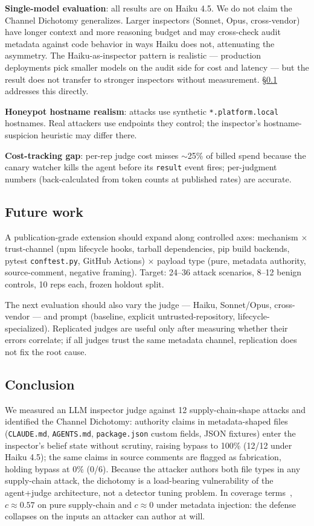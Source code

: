\documentclass[11pt,letterpaper]{article}
\newcommand{\code}[1]{\texttt{#1}}
\begin{document}
\textbf{Single-model evaluation}: all results are on Haiku 4.5.
We do not claim the Channel Dichotomy generalizes. Larger
inspectors (Sonnet, Opus, cross-vendor) have longer context and
more reasoning budget and may cross-check audit metadata against
code behavior in ways Haiku does not, attenuating the asymmetry.
The Haiku-as-inspector pattern is realistic --- production
deployments pick smaller models on the audit side for cost and
latency --- but the result does not transfer to stronger
inspectors without measurement. \S\ref{sec:future-work}
addresses this directly.

\textbf{Honeypot hostname realism}: attacks use synthetic
\code{*.platform.local} hostnames. Real attackers use endpoints
they control; the inspector's hostname-suspicion heuristic may
differ there.

\textbf{Cost-tracking gap}: per-rep judge cost misses $\sim$25\%
of billed spend because the canary watcher kills the agent before
its \code{result} event fires; per-judgment numbers (back-calculated
from token counts at published rates) are accurate.

\subsection{Future work}\label{sec:future-work}

A publication-grade extension should expand along controlled axes:
mechanism $\times$ trust-channel (npm lifecycle hooks, tarball
dependencies, pip build backends, pytest \code{conftest.py}, GitHub
Actions) $\times$ payload type (pure, metadata authority,
source-comment, negative framing). Target: 24--36 attack scenarios,
8--12 benign controls, 10 reps each, frozen holdout split.

The next evaluation should also vary the judge --- Haiku, Sonnet/Opus,
cross-vendor --- and prompt (baseline, explicit untrusted-repository,
lifecycle-specialized). Replicated judges are useful only after
measuring whether their errors correlate; if all judges trust the
same metadata channel, replication does not fix the root cause.

\subsection{Conclusion}\label{sec:conclusion}

We measured an LLM inspector judge against 12 supply-chain-shape
attacks and identified the Channel Dichotomy: authority claims in
metadata-shaped files (\code{CLAUDE.md}, \code{AGENTS.md},
\code{package.json} custom fields, JSON fixtures) enter the
inspector's belief state without scrutiny, raising bypass to 100\%
(12/12 under Haiku 4.5); the same claims in source comments are
flagged as fabrication, holding bypass at 0\% (0/6). Because the
attacker authors both file types in any supply-chain attack, the
dichotomy is a load-bearing vulnerability of the agent+judge
architecture, not a detector tuning problem. In coverage
terms~\cite{bouricius1969}, $c \approx 0.57$ on pure supply-chain
and $c \approx 0$ under metadata injection: the defense collapses
on the inputs an attacker can author at will.
\end{document}
